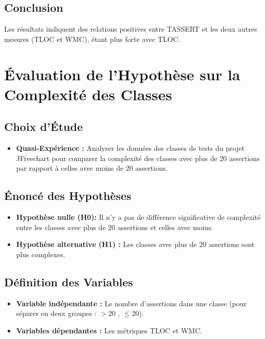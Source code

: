\documentclass[10pt]{article}
\begin{document}
\subsection{Conclusion}
Les résultats indiquent des relations positives entre TASSERT et les deux autres mesures (TLOC et WMC), étant plus forte avec TLOC. 


\section{Évaluation de l'Hypothèse sur la Complexité des Classes}

\subsection{Choix d'Étude}

\begin{itemize}
    \item\textbf{Quasi-Expérience :} Analyser les données des classes de tests du projet JFreechart pour comparer la complexité des classes avec plus de 20 assertions par rapport à celles avec moins de 20 assertions.
\end{itemize}

\subsection{Énoncé des Hypothèses}

\begin{itemize}
    \item \textbf{Hypothèse nulle (H0):} Il n'y a pas de différence significative de complexité entre les classes avec plus de 20 assertions et celles avec moins.
    \item\textbf{Hypothèse alternative (H1) :} Les classes avec plus de 20 assertions sont plus complexes.
\end{itemize}


\subsection{Définition des Variables}
\begin{itemize}
    \item\textbf{Variable indépendante :} Le nombre d'assertions dans une classe (pour séparer en deux groupes : $> 20$ , $\leq20$).
    \item\textbf{Variables dépendantes :}  Les métriques TLOC et WMC.
\end{itemize}
\end{document}
